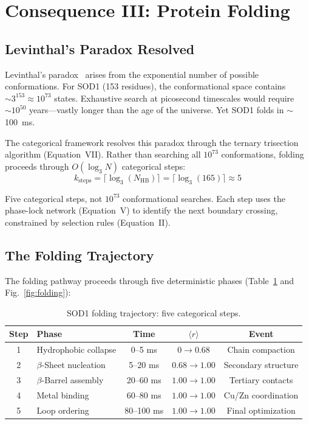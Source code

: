 \documentclass[aps,prx,superscriptaddress,twocolumn,10pt,a4paper,longbibliography,preprint]{revtex4-2}
\newcommand{\orderp}{\langle r \rangle}
\theoremstyle{definition}
\theoremstyle{remark}
\begin{document}
\section{Consequence III: Protein Folding}
\label{sec:folding}

\subsection{Levinthal's Paradox Resolved}

Levinthal's paradox~\cite{Levinthal1969} arises from the exponential number of possible conformations. For SOD1 (153 residues), the conformational space contains $\sim 3^{153} \approx 10^{73}$ states. Exhaustive search at picosecond timescales would require $\sim 10^{50}$ years---vastly longer than the age of the universe. Yet SOD1 folds in $\sim$100~ms.

The categorical framework resolves this paradox through the ternary trisection algorithm (Equation~VII). Rather than searching all $10^{73}$ conformations, folding proceeds through $O(\log_3 N)$ categorical steps:
\begin{equation}
k_{\text{steps}} = \lceil \log_3(N_{\text{HB}}) \rceil = \lceil \log_3(165) \rceil \approx 5
\end{equation}

Five categorical steps, not $10^{73}$ conformational searches. Each step uses the phase-lock network (Equation~V) to identify the next boundary crossing, constrained by selection rules (Equation~II).

\subsection{The Folding Trajectory}

The folding pathway proceeds through five deterministic phases (Table~\ref{tab:folding} and Fig.~\ref{fig:folding}):

\begin{table}[h]
\centering
\caption{SOD1 folding trajectory: five categorical steps.}
\label{tab:folding}
\begin{tabular}{clccc}
\toprule
Step & Phase & Time & $\orderp$ & Event \\
\midrule
1 & Hydrophobic collapse & 0--5 ms & $0 \to 0.68$ & Chain compaction \\
2 & $\beta$-Sheet nucleation & 5--20 ms & $0.68 \to 1.00$ & Secondary structure \\
3 & $\beta$-Barrel assembly & 20--60 ms & $1.00 \to 1.00$ & Tertiary contacts \\
4 & Metal binding & 60--80 ms & $1.00 \to 1.00$ & Cu/Zn coordination \\
5 & Loop ordering & 80--100 ms & $1.00 \to 1.00$ & Final optimization \\
\bottomrule
\end{tabular}
\end{table}
\end{document}
